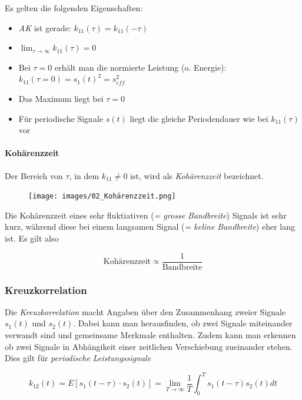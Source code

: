 \documentclass[
  10pt,
  a4paper,
  german]{article}
\let\oldparagraph\paragraph
\renewcommand{\paragraph}[1]{\oldparagraph{#1}\mbox{}}
\numberwithin{equation}{section}
\let\paragraph\oldparagraph
\renewcommand{\paragraph}[1]{\oldparagraph{#1}\mbox{}\par}
\begin{document}
Es gelten die folgenden Eigenschaften:

\begin{itemize}
\item
  \emph{AK} ist gerade: \(k_{11}(\tau)=k_{11}(-\tau)\)
\item
  \(\lim_{\tau\rightarrow\infty}k_{11}(\tau)=0\)
\item
  Bei \(\tau=0\) erhält man die normierte Leistung (o. Energie):
  \(k_{11}(\tau=0)=s_1(t)^2=s_{eff}^2\)
\item
  Das Maximum liegt bei \(\tau=0\)
\item
  Für periodische Signale \(s(t)\) liegt die gleiche Periodendauer wie
  bei \(k_{11}(\tau)\) vor
\end{itemize}

\hypertarget{kohuxe4renzzeit}{%
\paragraph{Kohärenzzeit}\label{kohuxe4renzzeit}}

Der Bereich von \(\tau\), in dem \(k_{11}\ne 0\) ist, wird als
\emph{Kohärenzzeit} bezeichnet.

\begin{figure}[H]

{\centering \texttt{[image: images/02\_Kohärenzzeit.png]}

}

\end{figure}

Die Kohärenzzeit eines sehr fluktiativen (\emph{= grosse Bandbreite})
Signals ist sehr kurz, während diese bei einem langsamen Signal (\emph{=
keline Bandbreite}) eher lang ist. Es gilt also

\[
\text{Kohärenzzeit}\propto \frac{1}{\text{Bandbreite}}
\]

\hypertarget{kreuzkorrelation}{%
\subsubsection{Kreuzkorrelation}\label{kreuzkorrelation}}

Die \emph{Kreuzkorrelation} macht Angaben über den Zusammenhang zweier
Signale \(s_1(t)\) und \(s_2(t)\). Dabei kann man herausfinden, ob zwei
Signale miteinander verwandt sind und gemeinsame Merkmale enthalten.
Zudem kann man erkennen ob zwei Signale in Abhängikeit einer zeitlichen
Verschiebung zueinander stehen. Dies gilt für \emph{periodische
Leistungssignale}

\[
k_{12}(t)=E[s_1(t-\tau)\cdot s_2(t)]=\lim_{T\rightarrow \infty}{\frac{1}{T}\int_0^T{s_1(t-\tau)s_2(t)dt}}
\]
\end{document}
